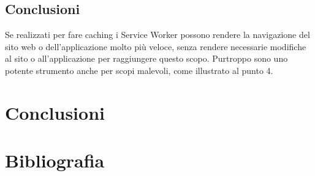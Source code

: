 \documentclass[11pt ,a4paper , twoside , openright ]{article}
\begin{document}
\subsection{Conclusioni}
Se realizzati per fare caching i Service Worker possono rendere la navigazione del sito web o dell'applicazione molto più veloce, senza rendere necessarie modifiche al sito o all'applicazione per raggiungere questo scopo. 
Purtroppo sono uno potente strumento anche per scopi malevoli, come illustrato al punto 4.

\newpage
\section{Conclusioni}

\newpage
\listoffigures
\newpage
\section{Bibliografia}
\end{document}
